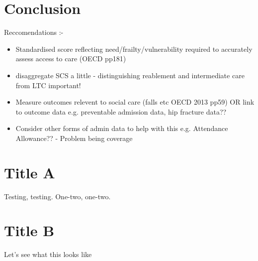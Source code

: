 \documentclass[12pt,]{report}
\begin{document}
\chapter{Conclusion}\label{ch:conclusion}

Reccomendations :-

\begin{itemize}
\item Standardised score reflecting need/frailty/vulnerability required to accurately assess access to care (OECD pp181)
\item disaggregate SCS a little - distinguishing reablement and intermediate care from LTC important!
\item Measure outcomes relevent to social care (falls etc OECD 2013 pp59) OR link to outcome data e.g. preventable admission data, hip fracture data??
\item Consider other forms of admin data to help with this e.g. Attendance Allowance?? - Problem being coverage
\end{itemize}

\FloatBarrier
\newpage
{}

\appendix
\chapter{Title A}

Testing, testing. One-two, one-two.

\chapter{Title B}

Let's see what this looks like

\FloatBarrier
\clearpage



\end{document}
